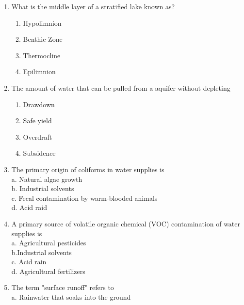 \begin{enumerate}
\item  What is the middle layer of a stratified lake known as?\\
\begin{enumerate}
\item Hypolimnion\\
\item Benthic Zone\\
\item Thermocline\\
\item Epilimnion
\end{enumerate}

\item  The amount of water that can be pulled from a aquifer without depleting\\
\begin{enumerate}
\item Drawdown\\
\item Safe yield\\
\item Overdraft\\
\item Subsidence
\end{enumerate}

  \item The primary origin of coliforms in water supplies is\\
a. Natural algae growth\\
b. Industrial solvents\\
c. Fecal contamination by warm-blooded animals\\
d. Acid raid\\

\item A primary source of volatile organic chemical (VOC) contamination of water supplies is\\
a. Agricultural pesticides\\

b.Industrial solvents\\

c. Acid rain\\

d. Agricultural fertilizers\\

\item The term "surface runoff" refers to\\

a. Rainwater that soaks into the ground\\


\end{enumerate}
